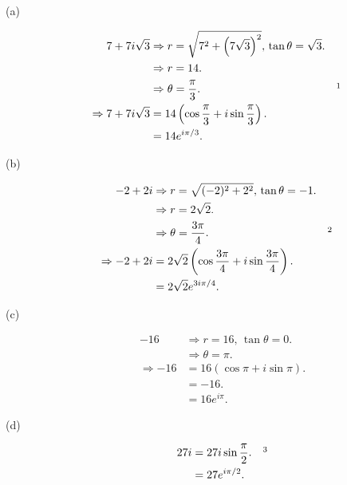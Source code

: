 \documentclass{tufte-handout}
\begin{document}
\begin{description}
\item[\textup{(a)}]
  \begin{align*}
    7 + 7i\sqrt{3} &\Rightarrow r=\sqrt{7^2 +
                     {\left(7\sqrt{3}\right)}^2}, \, \tan\theta =
                     \sqrt{3}.\\
                   &\Rightarrow r = 14.\\
                   &\Rightarrow \theta = {\pi \over 3}. && \footnotemark\\
    \Rightarrow 7 + 7i\sqrt{3} &= 14\left(\cos{\pi \over 3} +
                                 i\sin{\pi \over 3}\right).\\
                                 &= 14e^{i\pi / 3}.
  \end{align*}

\item[\textup{(b)}]
  \begin{align*}
    -2 + 2i &\Rightarrow r = \sqrt{(-2)^2 + 2^2}, \, \tan \theta =
              -1.\\
            &\Rightarrow r = 2 \sqrt 2.\\
            &\Rightarrow \theta = {3\pi \over 4}. && \footnotemark\\
    \Rightarrow -2 + 2i &= 2\sqrt2 \left(\cos{3\pi \over 4} +
                          i\sin{3\pi \over 4}\right).\\
            &= 2\sqrt2 e^{3i\pi / 4}.
  \end{align*}

\item[\textup{(c)}]
  \begin{align*}
    -16 &\Rightarrow r = 16, \, \tan \theta = 0.\\
        &\Rightarrow \theta = \pi.\\
    \Rightarrow -16 &= 16(\cos \pi + i\sin \pi).\\
        &= -16.\\
        &= 16e^{i\pi}.
  \end{align*}

\item[\textup{(d)}]
  \begin{align*}
    27i &= 27i \sin {\pi \over 2}. && \footnotemark\\
        &= 27e^{i\pi / 2}.
  \end{align*}
\end{description}
\end{document}
